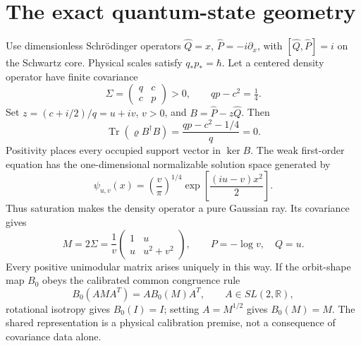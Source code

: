 \documentclass[11pt]{article}
\newcommand{\Tr}{\operatorname{Tr}}
\newcommand{\R}{\mathbb R}
\begin{document}
\section{The exact quantum-state geometry}
Use dimensionless Schr\"odinger operators $\widehat Q=x$, $\widehat P=-i\partial_x$, with $[\widehat Q,\widehat P]=i$ on the Schwartz core. Physical scales satisfy $q_*p_*=\hbar$. Let a centered density operator have finite covariance
\[
\Sigma=\begin{pmatrix}q&c\\c&p\end{pmatrix}>0,
\qquad qp-c^2=\tfrac14.
\]
Set $z=(c+i/2)/q=u+iv$, $v>0$, and $B=\widehat P-z\widehat Q$. Then
\[
\Tr(\varrho B^\dagger B)=\frac{qp-c^2-1/4}{q}=0.
\]
Positivity places every occupied support vector in $\ker B$. The weak first-order equation has the one-dimensional normalizable solution space generated by
\begin{equation}\label{eq:gaussian}
\psi_{u,v}(x)=\left(\frac v\pi\right)^{1/4}
\exp\!\left[\frac{(iu-v)x^2}{2}\right].
\end{equation}
Thus saturation makes the density operator a pure Gaussian ray. Its covariance gives
\begin{equation}\label{eq:Muv}
M=2\Sigma=\frac1v\begin{pmatrix}1&u\\u&u^2+v^2\end{pmatrix},\qquad
P=-\log v,\quad Q=u.
\end{equation}
Every positive unimodular matrix arises uniquely in this way. If the orbit-shape map $B_0$ obeys the calibrated common congruence rule
\[
B_0(AMA^T)=AB_0(M)A^T,\qquad A\in SL(2,\R),
\]
rotational isotropy gives $B_0(I)=I$; setting $A=M^{1/2}$ gives $B_0(M)=M$. The shared representation is a physical calibration premise, not a consequence of covariance data alone.
\end{document}
